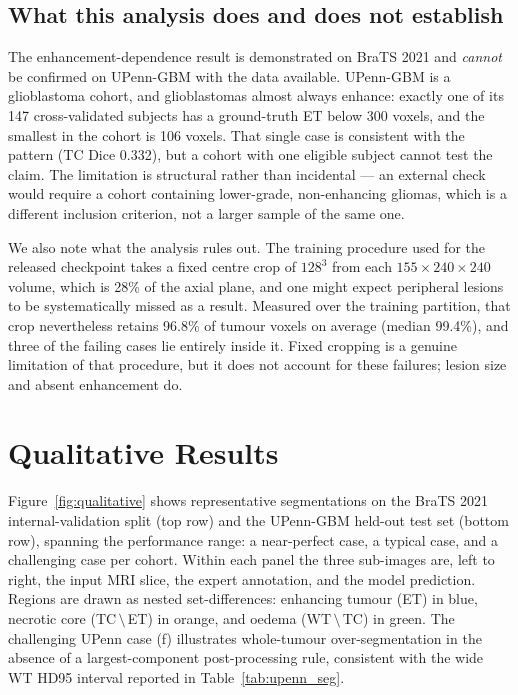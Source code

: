 \documentclass[conference]{IEEEtran}
\begin{document}
\subsection{What this analysis does and does not establish}
\label{sec:failure_limits}

The enhancement-dependence result is demonstrated on BraTS 2021 and \emph{cannot} be confirmed on UPenn-GBM with the data available. UPenn-GBM is a glioblastoma cohort, and glioblastomas almost always enhance: exactly one of its 147 cross-validated subjects has a ground-truth ET below 300 voxels, and the smallest in the cohort is 106 voxels. That single case is consistent with the pattern (TC Dice 0.332), but a cohort with one eligible subject cannot test the claim. The limitation is structural rather than incidental --- an external check would require a cohort containing lower-grade, non-enhancing gliomas, which is a different inclusion criterion, not a larger sample of the same one.

We also note what the analysis rules out. The training procedure used for the released checkpoint takes a fixed centre crop of $128^3$ from each $155\times240\times240$ volume, which is 28\% of the axial plane, and one might expect peripheral lesions to be systematically missed as a result. Measured over the training partition, that crop nevertheless retains 96.8\% of tumour voxels on average (median 99.4\%), and three of the failing cases lie entirely inside it. Fixed cropping is a genuine limitation of that procedure, but it does not account for these failures; lesion size and absent enhancement do.

\section{Qualitative Results}
\label{sec:qualitative}

Figure~\ref{fig:qualitative} shows representative segmentations on the BraTS 2021 internal-validation split (top row) and the UPenn-GBM held-out test set (bottom row), spanning the performance range: a near-perfect case, a typical case, and a challenging case per cohort. Within each panel the three sub-images are, left to right, the input MRI slice, the expert annotation, and the model prediction. Regions are drawn as nested set-differences: enhancing tumour (ET) in blue, necrotic core (TC\,$\setminus$\,ET) in orange, and oedema (WT\,$\setminus$\,TC) in green. The challenging UPenn case (f) illustrates whole-tumour over-segmentation in the absence of a largest-component post-processing rule, consistent with the wide WT HD95 interval reported in Table~\ref{tab:upenn_seg}.
\end{document}
